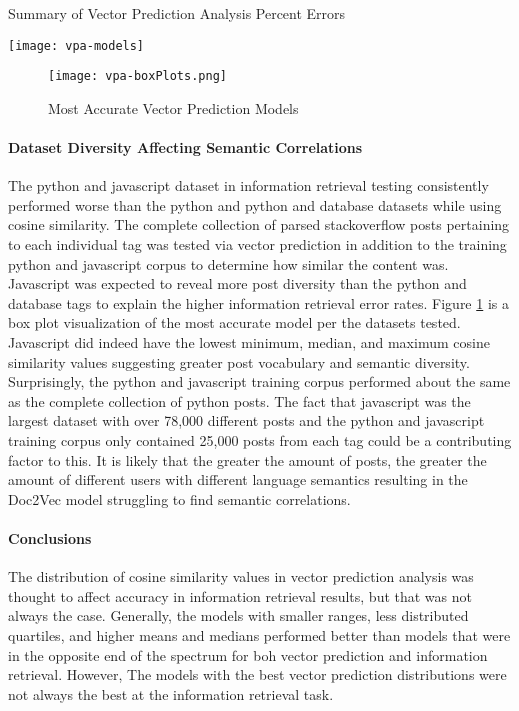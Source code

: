 \begin{table}[ht]
\caption{Summary of Vector Prediction Analysis Percent Errors}
\label{vpa-models}
\centering
\texttt{[image: vpa-models]}
\end{table}


\begin{figure}[ht]
\caption{Most Accurate Vector Prediction Models}
\label{vpa-boxPlots}
\centering
\texttt{[image: vpa-boxPlots.png]}
\end{figure}

\paragraph{Dataset Diversity Affecting Semantic Correlations}
The python and javascript dataset in information retrieval testing consistently performed worse than the python and python and database datasets while using cosine similarity. The complete collection of parsed stackoverflow posts pertaining to each individual tag was tested via vector prediction in addition to the training python and javascript corpus to determine how similar the content was. Javascript was expected to reveal more post diversity than the python and database tags to explain the higher information retrieval error rates. Figure \ref{vpa-boxPlots} is a box plot visualization of the most accurate model per the datasets tested. Javascript did indeed have the lowest minimum, median, and maximum cosine similarity values suggesting greater post vocabulary and semantic diversity. Surprisingly, the python and javascript training corpus performed about the same as the complete collection of python posts. The fact that javascript was the largest dataset with over 78,000 different posts and the python and javascript training corpus only contained 25,000 posts from each tag could be a contributing factor to this. It is likely that the greater the amount of posts, the greater the amount of different users with different language semantics resulting in the Doc2Vec model struggling to find semantic correlations.

\paragraph{Conclusions}
The distribution of cosine similarity values in vector prediction analysis was thought to affect accuracy in information retrieval results, but that was not always the case. Generally, the models with smaller ranges, less distributed quartiles, and higher means and medians performed better than models that were in the opposite end of the spectrum for boh vector prediction and information retrieval. However, The models with the best vector prediction distributions were not always the best at the information retrieval task.

